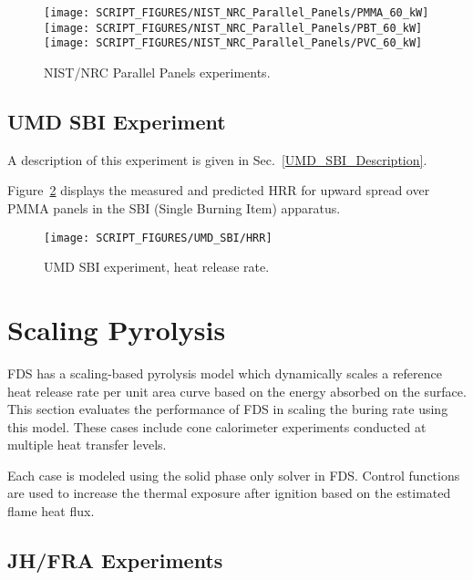 \begin{figure}[!ht]
\centering
\texttt{[image: SCRIPT\_FIGURES/NIST\_NRC\_Parallel\_Panels/PMMA\_60\_kW]} \\
\texttt{[image: SCRIPT\_FIGURES/NIST\_NRC\_Parallel\_Panels/PBT\_60\_kW]} \\
\texttt{[image: SCRIPT\_FIGURES/NIST\_NRC\_Parallel\_Panels/PVC\_60\_kW]}
\caption[NIST/NRC Parallel Panels experiments]{NIST/NRC Parallel Panels experiments.}
\label{NIST_NRC_PP_HRR}
\end{figure}


\clearpage

\subsection{UMD SBI Experiment}

A description of this experiment is given in Sec.~\ref{UMD_SBI_Description}.

Figure~\ref{UMD_SBI_HRR} displays the measured and predicted HRR for upward spread over PMMA panels in the SBI (Single Burning Item) apparatus. 

\begin{figure}[!ht]
\centering
\texttt{[image: SCRIPT\_FIGURES/UMD\_SBI/HRR]}
\caption[UMD SBI experiment, heat release rate]{UMD SBI experiment, heat release rate.}
\label{UMD_SBI_HRR}
\end{figure}

\clearpage

\section{Scaling Pyrolysis}\label{sec_Scaling Pyrolysis}

FDS has a scaling-based pyrolysis model which dynamically scales a reference heat release rate per unit area curve based on the energy absorbed on the surface.
This section evaluates the performance of FDS in scaling the buring rate using this model.
These cases include cone calorimeter experiments conducted at multiple heat transfer levels. 

Each case is modeled using the solid phase only solver in FDS.
Control functions are used to increase the thermal exposure after ignition based on the estimated flame heat flux.

\subsection{JH/FRA Experiments}\label{sec_JH_FRA_Materials}

